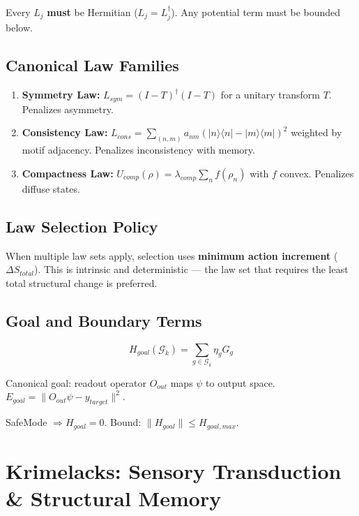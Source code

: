 \documentclass[11pt, a4paper]{report}
\begin{document}
Every $L_j$ \textbf{must} be Hermitian ($L_j = L_j^\dagger$). Any potential
term must be bounded below.

\section{Canonical Law Families}

\begin{enumerate}[label=(\Alph*)]
  \item \textbf{Symmetry Law:} $L_{sym} = (I - T)^\dagger(I - T)$ for a
        unitary transform $T$. Penalizes asymmetry.
  \item \textbf{Consistency Law:} $L_{cons} = \sum_{(n,m)} a_{nm}(|n\rangle\langle n| - |m\rangle\langle m|)^2$
        weighted by motif adjacency. Penalizes inconsistency with memory.
  \item \textbf{Compactness Law:} $U_{comp}(\rho) = \lambda_{comp} \sum_n f(\rho_n)$
        with $f$ convex. Penalizes diffuse states.
\end{enumerate}

\section{Law Selection Policy}

When multiple law sets apply, selection uses \textbf{minimum action
increment} ($\Delta S_{total}$). This is intrinsic and deterministic ---
the law set that requires the least total structural change is preferred.

\section{Goal and Boundary Terms}

\begin{equation}
  H_{goal}(\mathcal{G}_k) = \sum_{g \in \mathcal{G}_k} \eta_g G_g
\end{equation}

Canonical goal: readout operator $O_{out}$ maps $\psi$ to output space.
$E_{goal} = \|O_{out}\psi - y_{target}\|^2$.

SafeMode $\Rightarrow H_{goal} = 0$. Bound: $\|H_{goal}\| \leq H_{goal,max}$.

\chapter{Krimelacks: Sensory Transduction \& Structural Memory}
\end{document}
